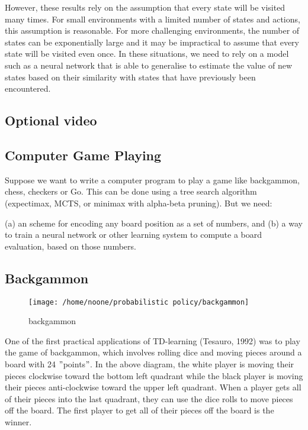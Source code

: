 \documentclass[11pt]{article}
\begin{document}
However, these results rely on the assumption that every state will be visited
many times.
For small environments with a limited number of states and actions, this
assumption is reasonable.
For more challenging environments, the number of states can be exponentially
large and it may be impractical to assume that every state will be visited even
once.
In these situations, we need to rely on a model such as a neural network that
is able to generalise to estimate the value of new states based on their
similarity with states that have previously been encountered.

\subsection{Optional video}\label{subsec:optional-video7}

\subsection{Computer Game Playing}\label{subsec:computer-game-playing}
Suppose we want to write a computer program to play a game like backgammon,
chess, checkers or Go. This can be done using a tree search algorithm
(expectimax, MCTS, or minimax with alpha-beta pruning).
But we need:

(a) an scheme for encoding any board position as a set of numbers, and
(b) a way to train a neural network or other learning system to compute a board evaluation, based on those numbers.

\subsection{Backgammon}\label{subsec:backgammon}

\begin{figure}[h]
    \centering
    \texttt{[image: /home/noone/probabilistic policy/backgammon]}
    \caption[backgammon]{backgammon}
    \label{fig:backgammon}
\end{figure}

One of the first practical applications of TD-learning (Tesauro, 1992) was to
play the game of backgammon, which involves rolling dice and moving pieces
around a board with 24 \("\)points\("\).
In the above diagram, the white player is moving their pieces clockwise toward
the bottom left quadrant while the black player is moving their pieces
anti-clockwise toward the upper left quadrant.
When a player gets all of their pieces into the last quadrant, they can use the
dice rolls to move pieces off the board.
The first player to get all of their pieces off the board is the winner.
\end{document}
